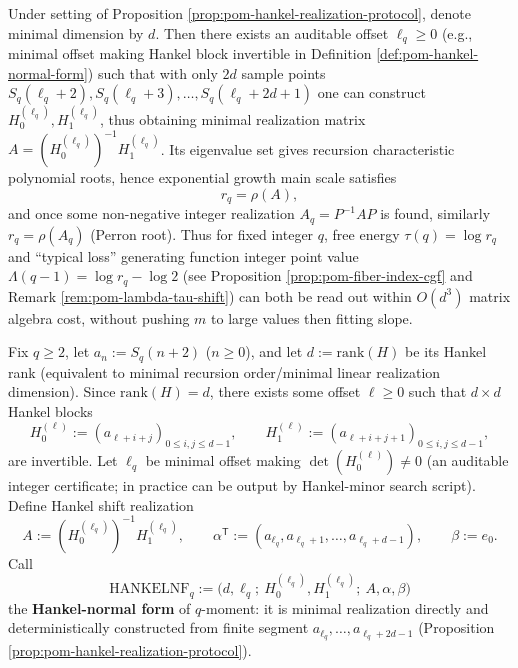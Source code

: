 \begin{corollary}\label{cor:pom-hankel-free-energy-evaluator}
Under setting of Proposition \ref{prop:pom-hankel-realization-protocol}, denote minimal dimension by \(d\).
Then there exists an auditable offset \(\ell_q\ge 0\) (e.g., minimal offset making Hankel block invertible in Definition \ref{def:pom-hankel-normal-form}) such that with only \(2d\) sample points
\(
S_q(\ell_q+2),S_q(\ell_q+3),\dots,S_q(\ell_q+2d+1)
\)
one can construct \(H_0^{(\ell_q)},H_1^{(\ell_q)}\), thus obtaining minimal realization matrix \(A=(H_0^{(\ell_q)})^{-1}H_1^{(\ell_q)}\).
Its eigenvalue set gives recursion characteristic polynomial roots, hence exponential growth main scale satisfies
\[
r_q=\rho(A),
\]
and once some non-negative integer realization \(A_q=P^{-1}AP\) is found, similarly \(r_q=\rho(A_q)\) (Perron root).
Thus for fixed integer \(q\), free energy \(\tau(q)=\log r_q\) and ``typical loss'' generating function integer point value
\(
\Lambda(q-1)=\log r_q-\log2
\)
(see Proposition \ref{prop:pom-fiber-index-cgf} and Remark \ref{rem:pom-lambda-tau-shift}) can both be read out within \(O(d^3)\) matrix algebra cost, without pushing \(m\) to large values then fitting slope.
\end{corollary}

\begin{definition}\label{def:pom-hankel-normal-form}
Fix \(q\ge 2\), let \(a_n:=S_q(n+2)\) (\(n\ge 0\)), and let \(d:=\mathrm{rank}(H)\) be its Hankel rank (equivalent to minimal recursion order/minimal linear realization dimension).
Since \(\mathrm{rank}(H)=d\), there exists some offset \(\ell\ge 0\) such that \(d\times d\) Hankel blocks
\[
H_0^{(\ell)}:=(a_{\ell+i+j})_{0\le i,j\le d-1},
\qquad
H_1^{(\ell)}:=(a_{\ell+i+j+1})_{0\le i,j\le d-1},
\]
are invertible.
Let \(\ell_q\) be minimal offset making \(\det(H_0^{(\ell)})\neq 0\) (an auditable integer certificate; in practice can be output by Hankel-minor search script).
Define Hankel shift realization
\[
A:=(H_0^{(\ell_q)})^{-1}H_1^{(\ell_q)},
\qquad
\alpha^{\mathsf T}:=(a_{\ell_q},a_{\ell_q+1},\dots,a_{\ell_q+d-1}),
\qquad
\beta:=e_0.
\]
Call
\[
\boxed{\;
\mathrm{HANKELNF}_q:=\bigl(d,\ell_q;\ H_0^{(\ell_q)},H_1^{(\ell_q)};\ A,\alpha,\beta\bigr)\;}
\]
the \textbf{Hankel-normal form} of \(q\)-moment: it is minimal realization directly and deterministically constructed from finite segment \(a_{\ell_q},\dots,a_{\ell_q+2d-1}\) (Proposition \ref{prop:pom-hankel-realization-protocol}).
\end{definition}

